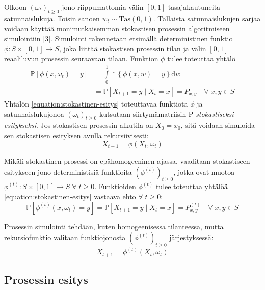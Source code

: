 \documentclass[finnish, 12pt, a4paper, sci, utf8, pdfa]{aaltothesis}
\newcommand{\indicator}{\mathopen{\mathds{1}}}
\newcommand*{\prob}{\mathbb{P}}
\begin{document}
Olkoon \( (\omega_{t})_{t \geq 0} \) jono riippumattomia välin \( [0, 1] \) tasajakautuneita satunnaislukuja. Toisin sanoen \( w_{t} \sim \text{Tas}(0, 1) \). Tällaista satunnaislukujen sarjaa voidaan käyttää monimutkaisemman stokastisen prosessin algoritmiseen simulointiin [3]. Simulointi rakennetaan etsimällä deterministinen funktio \( \phi : S \times [0, 1] \to S \), joka liittää stokastisen prosessin tilan ja välin \( [0, 1] \) reaaliluvun prosessin seuraavaan tilaan. Funktion \( \phi \) tulee toteuttaa yhtälö
\begin{align}
   \prob \left[ \phi(x, \omega_{t}) = y \right] &= \int\limits_0^1 \; \indicator \left\{ \phi(x, w) = y \right\} \mathrm{d}w \\
                                                &= \prob \left[ X_{t+1} = y \mid X_{t} = x \right] = P_{x,y} \quad \forall \; x, y \in S
   \label{equation:stokastinen-esitys}
\end{align}
Yhtälön \ref{equation:stokastinen-esitys} toteuttavaa funktiota \( \phi \) ja satunnaislukujonoa \( (\omega_{t})_{t \geq 0} \) kutsutaan siirtymämatriisin P \textit{stokastiseksi esitykseksi}. Jos stokastisen prosessin alkutila on \( X_{0} = x_{0} \), sitä voidaan simuloida sen stokastisen esityksen avulla rekursiivisesti:
\begin{equation}
   X_{t+1} = \phi(X_{t}, \omega_{t})
\end{equation}

Mikäli stokastinen prosessi on epähomogeeninen ajassa, vaaditaan stokastiseen esitykseen jono deterministisiä funktioita \( (\phi^{(t)})_{t \geq 0} \), jotka ovat muotoa \( \phi^{(t)} : S \times [0, 1] \to S \; \forall \; t \geq 0 \). Funktioiden \( \phi^{(t)} \) tulee toteuttaa yhtälöä \ref{equation:stokastinen-esitys} vastaava ehto \( \forall \; t \geq 0 \):
\begin{equation}
   \prob \left[ \phi^{(t)}(x, \omega_{t}) = y \right] = \prob \left[ X_{t+1} = y \mid X_{t} = x \right] = P^{(t)}_{x,y} \quad \forall \; x, y \in S
   \label{equation:epahom-stokastinen-esitys}
\end{equation}

Prosessin simulointi tehdään, kuten homogeenisessa tilanteessa, mutta rekursiofunktio valitaan funktiojonosta \( (\phi^{(t)})_{t \geq 0} \) järjestyksessä:
\begin{equation}
   X_{t+1} = \phi^{(t)}(X_{t}, \omega_{t})
\end{equation}

\subsection{Prosessin esitys}
\end{document}
